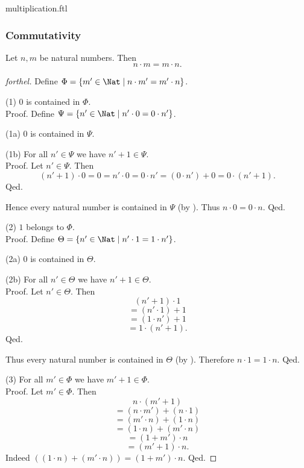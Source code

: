 \documentclass{naproche-library}
\begin{document}
\begin{smodule}{multiplication.ftl}
  \subsubsection*{Commutativity}

  \begin{proposition}[forthel,id=ARITHMETIC_06_1764759896588288]
    Let $n, m$ be natural numbers.
    Then \[ n \cdot m = m \cdot n. \]
  \end{proposition}
  \begin{proof}[forthel]
    Define $\Phi = \{ m' \in \Nat \mid n \cdot m' = m' \cdot n \}$.

    (1) $0$ is contained in $\Phi$. \\
    Proof.
      Define $\Psi = \{ n' \in \Nat \mid n' \cdot 0 = 0 \cdot n' \}$.

      (1a) $0$ is contained in $\Psi$.

      (1b) For all $n' \in \Psi$ we have $n' + 1 \in \Psi$. \\
      Proof.
        Let $n' \in \Psi$.
        Then
        \[ (n' + 1) \cdot 0
          = 0
          = n' \cdot 0
          = 0 \cdot n'
          = (0 \cdot n') + 0
          = 0 \cdot (n' + 1). \]
      Qed.

      Hence every natural number is contained in $\Psi$ (by ).
      Thus $n \cdot 0 = 0 \cdot n$.
    Qed.

    (2) $1$ belongs to $\Phi$. \\
    Proof.
      Define $\Theta = \{ n' \in \Nat \mid n' \cdot 1 = 1 \cdot n' \}$.

      (2a) $0$ is contained in $\Theta$.

      (2b) For all $n' \in \Theta$ we have $n' + 1 \in \Theta$. \\
      Proof.
        Let $n' \in \Theta$.
        Then
        \[  (n' + 1) \cdot 1        \]
        \[    = (n' \cdot 1) + 1    \]
        \[    = (1 \cdot n') + 1    \]
        \[    = 1 \cdot (n' + 1).   \]
      Qed.

      Thus every natural number is contained in $\Theta$ (by ).
      Therefore $n \cdot 1 = 1 \cdot n$.
    Qed.

    (3) For all $m' \in \Phi$ we have $m' + 1 \in \Phi$. \\
    Proof.
      Let $m' \in \Phi$.
      Then
      \[  n \cdot (m' + 1)                \]
      \[    = (n \cdot m') + (n \cdot 1)  \]
      \[    = (m' \cdot n) + (1 \cdot n)  \]
      \[    = (1 \cdot n) + (m' \cdot n)  \]
      \[    = (1 + m') \cdot n            \]
      \[    = (m' + 1) \cdot n.           \]
      Indeed $((1 \cdot n) + (m' \cdot n)) = (1 + m') \cdot n$. %
    Qed.


\end{proof}
\end{smodule}
\end{document}
